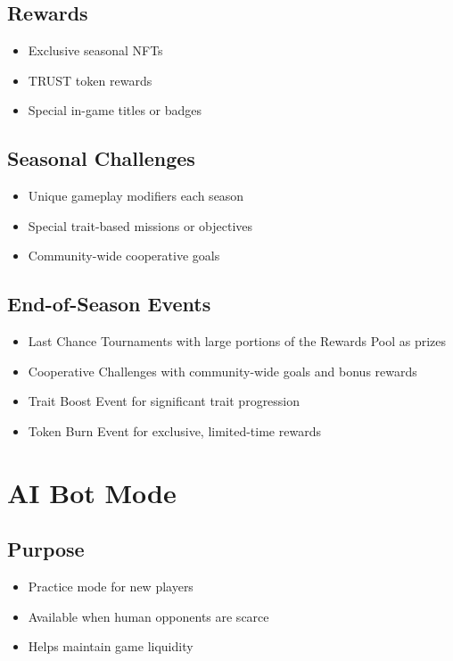 \documentclass[12pt,a4paper]{article}
\begin{document}
\subsection{Rewards}
\begin{itemize}
    \item Exclusive seasonal NFTs
    \item TRUST token rewards
    \item Special in-game titles or badges
\end{itemize}

\subsection{Seasonal Challenges}
\begin{itemize}
    \item Unique gameplay modifiers each season
    \item Special trait-based missions or objectives
    \item Community-wide cooperative goals
\end{itemize}

\subsection{End-of-Season Events}
\begin{itemize}
    \item Last Chance Tournaments with large portions of the Rewards Pool as prizes
    \item Cooperative Challenges with community-wide goals and bonus rewards
    \item Trait Boost Event for significant trait progression
    \item Token Burn Event for exclusive, limited-time rewards
\end{itemize}

\section{AI Bot Mode}

\subsection{Purpose}
\begin{itemize}
    \item Practice mode for new players
    \item Available when human opponents are scarce
    \item Helps maintain game liquidity
\end{itemize}
\end{document}

